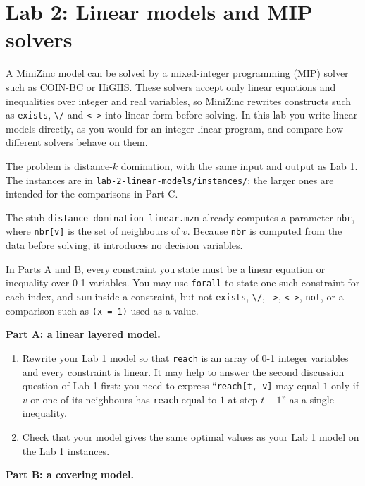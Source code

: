 \documentclass[11pt]{article}
\begin{document}
\section*{Lab 2: Linear models and MIP solvers}

A MiniZinc model can be solved by a mixed-integer programming (MIP) solver such as COIN-BC or HiGHS. These solvers accept only linear equations and inequalities over integer and real variables, so MiniZinc rewrites constructs such as \mbox{\texttt{exists}}, \mbox{\texttt{\textbackslash{}/\allowbreak{}}} and \mbox{\texttt{\textless{}-{}\textgreater{}}} into linear form before solving. In this lab you write linear models directly, as you would for an integer linear program, and compare how different solvers behave on them.

The problem is distance-$k$ domination, with the same input and output as Lab 1. The instances are in \texttt{lab-{}2-{}linear-{}models/\allowbreak{}instances/\allowbreak{}}; the larger ones are intended for the comparisons in Part C.

The stub \texttt{distance-{}domination-{}linear.mzn} already computes a parameter \mbox{\texttt{nbr}}, where \mbox{\texttt{nbr[v]}} is the set of neighbours of $v$. Because \mbox{\texttt{nbr}} is computed from the data before solving, it introduces no decision variables.

In Parts A and B, every constraint you state must be a linear equation or inequality over 0-1 variables. You may use \mbox{\texttt{forall}} to state one such constraint for each index, and \mbox{\texttt{sum}} inside a constraint, but not \mbox{\texttt{exists}}, \mbox{\texttt{\textbackslash{}/\allowbreak{}}}, \mbox{\texttt{-{}\textgreater{}}}, \mbox{\texttt{\textless{}-{}\textgreater{}}}, \mbox{\texttt{not}}, or a comparison such as \mbox{\texttt{(x = 1)}} used as a value.

\textbf{Part A: a linear layered model.}

\begin{enumerate}
\item Rewrite your Lab 1 model so that \mbox{\texttt{reach}} is an array of 0-1 integer variables and every constraint is linear. It may help to answer the second discussion question of Lab 1 first: you need to express ``\mbox{\texttt{reach[t, v]}} may equal $1$ only if $v$ or one of its neighbours has \mbox{\texttt{reach}} equal to $1$ at step $t-1$'' as a single inequality.
\item Check that your model gives the same optimal values as your Lab 1 model on the Lab 1 instances.
\end{enumerate}
\textbf{Part B: a covering model.}
\end{document}
